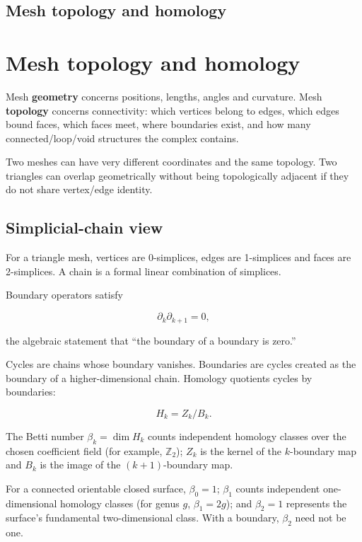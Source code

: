 \hypertarget{appendix-e38976cbbf86}{}
\section*{Mesh topology and homology}
\chapter{Mesh topology and homology}\label{appendix-e38976cbbf86-mesh-topology-and-homology}

Mesh \textbf{geometry} concerns positions, lengths, angles and curvature. Mesh \textbf{topology} concerns connectivity: which vertices belong to edges, which edges bound faces, which faces meet, where boundaries exist, and how many connected/loop/void structures the complex contains.

Two meshes can have very different coordinates and the same topology. Two triangles can overlap geometrically without being topologically adjacent if they do not share vertex/edge identity.

\section{Simplicial-chain view}\label{appendix-e38976cbbf86-simplicial-chain-view}

For a triangle mesh, vertices are 0-simplices, edges are 1-simplices and faces are 2-simplices. A chain is a formal linear combination of simplices.

Boundary operators satisfy

\[
\partial_k\partial_{k+1}=0,
\]

the algebraic statement that ``the boundary of a boundary is zero.''

Cycles are chains whose boundary vanishes. Boundaries are cycles created as the boundary of a higher-dimensional chain. Homology quotients cycles by boundaries:

\[
H_k=Z_k/B_k.
\]

The Betti number \(\beta_k=\dim H_k\) counts independent homology classes over the chosen coefficient field (for example, \(\mathbb{Z}_2\)); \(Z_k\) is the kernel of the \(k\)-boundary map and \(B_k\) is the image of the \((k+1)\)-boundary map.

For a connected orientable closed surface, \(\beta_0=1\); \(\beta_1\) counts independent one-dimensional homology classes (for genus \(g\), \(\beta_1=2g\)); and \(\beta_2=1\) represents the surface's fundamental two-dimensional class. With a boundary, \(\beta_2\) need not be one.

